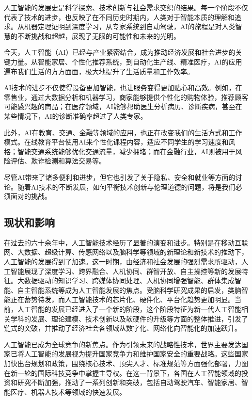 人工智能的发展史是科学探索、技术创新与社会需求交织的结果。每一个阶段不仅代表了技术的进步，也反映了在不同历史时期内，人类对于智能本质的理解和追求。从机器定理证明到深度学习，从专家系统到自动驾驶，AI的旅程是对人类智慧的不断挑战和超越，展现了无限的可能性和未来的光明。

今天，人工智能（AI）已经与产业紧密结合，成为推动经济发展和社会进步的关键力量。从智能家居、个性化推荐系统，到自动化生产线、精准医疗，AI的应用遍布我们生活的方方面面，极大地提升了生活质量和工作效率。

AI技术的进步不仅使得设备更加智能，也让服务变得更加贴心和高效。例如，在零售业，通过大数据分析和机器学习，商家能够提供个性化的购物体验，推荐顾客可能感兴趣的商品；在医疗领域，AI能够帮助医生分析病历、诊断疾病，甚至在某些情况下，AI的诊断准确率超过了人类专家。

此外，AI在教育、交通、金融等领域的应用，也正在改变我们的生活方式和工作模式。在线教育平台使用AI来个性化课程内容，适应不同学生的学习速度和风格；智能交通系统能够优化交通流量，减少拥堵；而在金融行业，AI则被用于风险评估、欺诈检测和算法交易等。

尽管AI带来了诸多便利和进步，但它也引发了关于隐私、安全和就业等方面的讨论。随着AI技术的不断发展，如何平衡技术创新与伦理道德的问题，将是我们必须面对的挑战。

\subsection[现状和影响]{现状和影响}

在过去的六十余年中，人工智能技术经历了显著的演变和进步。特别是在移动互联网、大数据、超级计算、传感网络以及脑科学等领域的新理论和新技术的推动下，人工智能的发展得到了加速。这一时期，由经济和社会发展的强烈需求所驱动，人工智能展现了深度学习、跨界融合、人机协同、群智开放、自主操控等新的发展特征。大数据驱动的知识学习、跨媒体协同处理、人机协同增强智能、群体集成智能、自主智能系统等成为人工智能发展的焦点。受脑科学研究成果的启发，类脑智能正在蓄势待发，而人工智能技术的芯片化、硬件化、平台化趋势更加明显。当前，人工智能的发展已经进入了一个新的阶段，这个阶段特征为新一代人工智能相关学科的发展、理论建模、技术创新以及软硬件的升级等方面的整体推进，引发了链式的突破，并推动了经济社会各领域从数字化、网络化向智能化的加速跃升。

人工智能已成为全球竞争的新焦点。作为引领未来的战略性技术，世界主要发达国家已将人工智能的发展视为提升国家竞争力和维护国家安全的重要战略。这些国家加快出台规划和政策，围绕核心技术、顶尖人才、标准规范等方面强化部署，力图在新一轮的国际科技竞争中掌握主导权。在这一背景下，各国在人工智能领域的投资和研究不断加强，推动了一系列创新和突破，包括自动驾驶汽车、智能家居、智能医疗、机器人技术等领域的快速发展。

